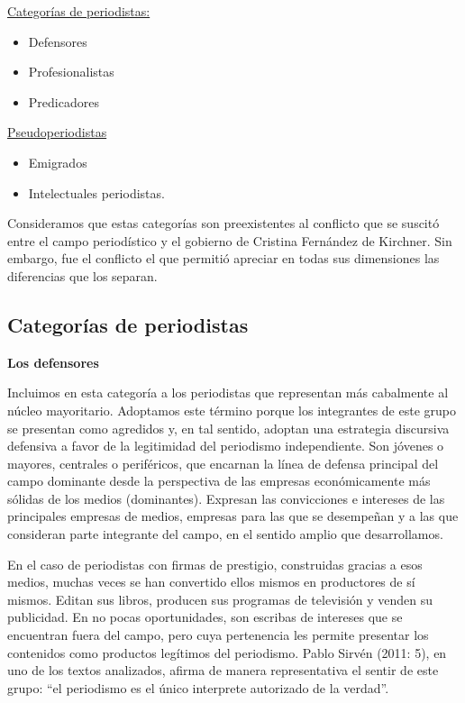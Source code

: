 \ul{Categorías de periodistas:}

\begin{itemize}
\item
Defensores
\item
Profesionalistas
\item
Predicadores
\end{itemize}

\ul{Pseudoperiodistas}

\begin{itemize}
\item
Emigrados
\item
Intelectuales periodistas.
\end{itemize}

Consideramos que estas categorías son preexistentes al conflicto que se suscitó entre el campo periodístico y el gobierno de Cristina Fernández de Kirchner. Sin embargo, fue el conflicto el que permitió apreciar en todas sus dimensiones las diferencias que los separan.

\subsection {Categorías de periodistas}

\textbf{Los defensores}

Incluimos en esta categoría a los periodistas que representan más cabalmente al núcleo mayoritario. Adoptamos este término porque los integrantes de este grupo se presentan como agredidos y, en tal sentido, adoptan una estrategia discursiva defensiva a favor de la legitimidad del periodismo independiente. Son jóvenes o mayores, centrales o periféricos, que encarnan la línea de defensa principal del campo dominante desde la perspectiva de las empresas económicamente más sólidas de los medios (dominantes). Expresan las convicciones e intereses de las principales empresas de medios, empresas para las que se desempeñan y a las que consideran parte integrante del campo, en el sentido amplio que desarrollamos.

En el caso de periodistas con firmas de prestigio, construidas gracias a esos medios, muchas veces se han convertido ellos mismos en productores de sí mismos. Editan sus libros, producen sus programas de televisión y venden su publicidad. En no pocas oportunidades, son escribas de intereses que se encuentran fuera del campo, pero cuya pertenencia les permite presentar los contenidos como productos legítimos del periodismo. Pablo Sirvén (2011: 5), en uno de los textos analizados, afirma de manera representativa el sentir de este grupo: ``el periodismo es el único interprete autorizado de la verdad''.

